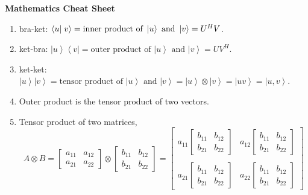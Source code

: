 \documentclass[10pt,a4paper]{article}
\newcommand{\bra}[1]{\ensuremath{\left\langle#1\right|}}
\newcommand{\ket}[1]{\ensuremath{\left|#1\right\rangle}}
\newcommand{\braket}[2]{\ensuremath{\left\langle#1 \vphantom{#2}\right| \left. #2 \vphantom{#1}\right\rangle}}
\begin{document}
\begin{center}
\textbf{\Huge Mathematics Cheat Sheet} 
\vspace{.2in}
\end{center}

\begin{enumerate}
  \item bra-ket: $\braket{u}{v} = \textrm{inner product of } \ket{u} \textrm{ and } \ket{v} = U^H V$.
  \item ket-bra: $\ket{u}\bra{v} = \textrm{outer product of } \ket{u} \textrm{ and } \ket{v} = U V^H$.
  \item ket-ket: $\ket{u}\ket{v} = \textrm{tensor product of } \ket{u} \textrm{ and } \ket{v} = \ket{u} \otimes \ket{v} = \ket{uv} = \ket{u, v}$.
  \item Outer product is the tensor product of two vectors.
  \item Tensor product of two matrices, 
    \begin{equation}
      A \otimes B
      = 
      \begin{bmatrix}
        a_{11} &a_{12} \\
        a_{21} &a_{22}
      \end{bmatrix}
      \otimes 
      \begin{bmatrix}
        b_{11} &b_{12} \\
        b_{21} &b_{22}
      \end{bmatrix}
      = 
      \begin{bmatrix}
        a_{11}
        \begin{bmatrix} 
          b_{11} &b_{12} \\
          b_{21} &b_{22}
        \end{bmatrix}
        &a_{12} 
        \begin{bmatrix} 
          b_{11} &b_{12} \\
          b_{21} &b_{22}
        \end{bmatrix}
        \\
        \\
        a_{21} 
        \begin{bmatrix} 
          b_{11} &b_{12} \\
          b_{21} &b_{22}
        \end{bmatrix}
        &a_{22}
        \begin{bmatrix} 
          b_{11} &b_{12} \\
          b_{21} &b_{22}
        \end{bmatrix}
      \end{bmatrix}

\end{equation}
\end{enumerate}
\end{document}
